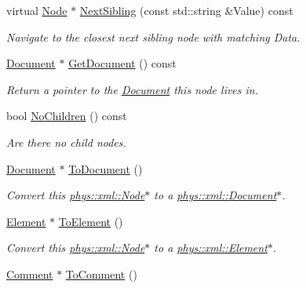 \begin{DoxyCompactItemize}
virtual \hyperlink{classphys_1_1xml_1_1Node}{Node} $\ast$ \hyperlink{classphys_1_1xml_1_1Node_ae35db3dcd4ea55a1a84be2cc6c435c7b}{NextSibling} (const std::string \&Value) const 
\begin{DoxyCompactList}\small\item\em Navigate to the closest next sibling node with matching Data. \item\end{DoxyCompactList}\item 
\hyperlink{classphys_1_1xml_1_1Document}{Document} $\ast$ \hyperlink{classphys_1_1xml_1_1Node_acb5094730846cfb3cf02e480da59e010}{GetDocument} () const 
\begin{DoxyCompactList}\small\item\em Return a pointer to the \hyperlink{classphys_1_1xml_1_1Document}{Document} this node lives in. \item\end{DoxyCompactList}\item 
bool \hyperlink{classphys_1_1xml_1_1Node_a53837a47377de4de9cf6320808d9ea4a}{NoChildren} () const 
\begin{DoxyCompactList}\small\item\em Are there no child nodes. \item\end{DoxyCompactList}\item 
\hyperlink{classphys_1_1xml_1_1Document}{Document} $\ast$ \hyperlink{classphys_1_1xml_1_1Node_a8afb097ad9afacb25915848b0f47c3fa}{ToDocument} ()
\begin{DoxyCompactList}\small\item\em Convert this \hyperlink{classphys_1_1xml_1_1Node}{phys::xml::Node}$\ast$ to a \hyperlink{classphys_1_1xml_1_1Document}{phys::xml::Document}$\ast$. \item\end{DoxyCompactList}\item 
\hyperlink{classphys_1_1xml_1_1Element}{Element} $\ast$ \hyperlink{classphys_1_1xml_1_1Node_a16f4ae9f4ccc55ed0642e1425ba846e3}{ToElement} ()
\begin{DoxyCompactList}\small\item\em Convert this \hyperlink{classphys_1_1xml_1_1Node}{phys::xml::Node}$\ast$ to a \hyperlink{classphys_1_1xml_1_1Element}{phys::xml::Element}$\ast$. \item\end{DoxyCompactList}\item 
\hyperlink{classphys_1_1xml_1_1Comment}{Comment} $\ast$ \hyperlink{classphys_1_1xml_1_1Node_a0119cd127ad5df7d768abde89e7bc410}{ToComment} ()

\end{DoxyCompactItemize}
